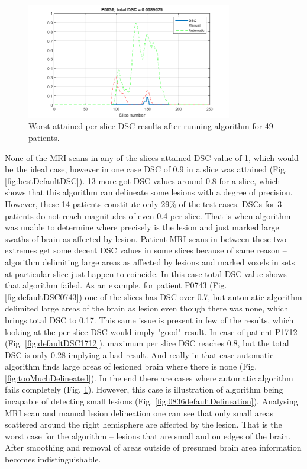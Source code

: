 \documentclass[12pt]{article}
\begin{document}
\begin{figure}[!htb]
\centering
\includegraphics[width=0.8\textwidth]{img/P0836_R}
\caption{Worst attained per slice DSC results after running algorithm for 49 patients.}
\label{fig:worstDefaultDSC}
\end{figure}

None of the MRI scans in any of the slices attained DSC value of 1, which would be the ideal case, however in one case DSC of 0.9 in a slice was attained (Fig. \ref{fig:bestDefaultDSC}). 13 more got DSC values around 0.8 for a slice, which shows that this algorithm can delineate some lesions with a degree of precision. However, these 14 patients constitute only 29\% of the test cases. DSCs for 3 patients do not reach magnitudes of even 0.4 per slice. That is when algorithm was unable to determine where precisely is the lesion and just marked large swaths of brain as affected by lesion. Patient MRI scans in between these two extremes get some decent DSC values in some slices because of same reason – algorithm delimiting large areas as affected by lesions and marked voxels in sets at particular slice just happen to coincide. In this case total DSC value shows that algorithm failed. As an example, for patient P0743 (Fig. \ref{fig:defaultDSC0743}) one of the slices has DSC over 0.7, but automatic algorithm delimited large areas of the brain as lesion even though there was none, which brings total DSC to 0.17. This same issue is present in few of the results, which looking at the per slice DSC would imply "good" result. In case of patient P1712 (Fig. \ref{fig:defaultDSC1712}), maximum per slice DSC reaches 0.8, but the total DSC is only 0.28 implying a bad result. And really in that case automatic algorithm finds large areas of lesioned brain where there is none (Fig. \ref{fig:tooMuchDelineated}). In the end there are cases where automatic algorithm fails completely (Fig. \ref{fig:worstDefaultDSC}). However, this case is illustration of algorithm being incapable of detecting small lesions (Fig. \ref{fig:0836defaultDelineation}). Analysing MRI scan and manual lesion delineation one can see that only small areas scattered around the right hemisphere are affected by the lesion. That is the worst case for the algorithm – lesions that are small and on edges of the brain. After smoothing and removal of areas outside of presumed brain area information becomes indistinguishable.
\end{document}
